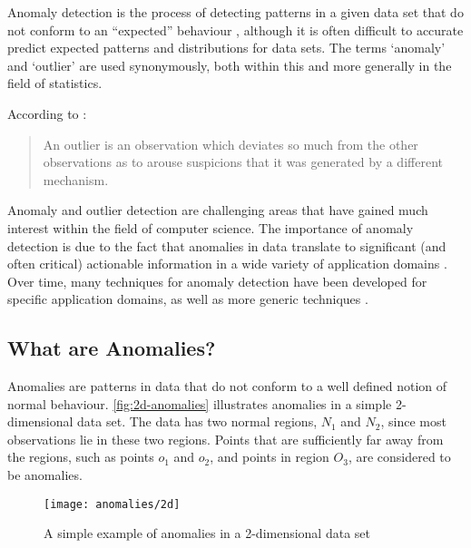 Anomaly detection is the process of detecting patterns in a given data set that
do not conform to an ``expected'' behaviour \cite{Chandola:2007}, although it is
often difficult to accurate predict expected patterns and distributions for data
sets. The terms `anomaly' and `outlier' are used synonymously, both within this
\thesis{} and more generally in the field of statistics.

According to \citeauthor{Hawkins:1980} \cite{Hawkins:1980}:
\begin{quote}
An outlier is an observation which deviates so much from the other observations
as to arouse suspicions that it was generated by a different mechanism.
\end{quote}

Anomaly and outlier detection are challenging areas that have gained much
interest within the field of computer science. The importance of anomaly
detection is due to the fact that anomalies in data translate to significant
(and often critical) actionable information in a wide variety of application
domains \cite{Chandola:2007}. Over time, many techniques for anomaly detection
have been developed for specific application domains, as well as more generic
techniques \cite{Chandola:2007}.

\subsection{What are Anomalies?}
\label{anomalyDetection:whatAre}
Anomalies are patterns in data that do not conform to a well defined notion of
normal behaviour. \autoref{fig:2d-anomalies} illustrates anomalies in a simple
2-dimensional data set. The data has two normal regions, $N_1$ and $N_2$, since
most observations lie in these two regions. Points that are sufficiently far
away from the regions, such as points $o_1$ and $o_2$, and points in region
$O_3$, are considered to be anomalies.

\begin{figure}
    \centering
    \texttt{[image: anomalies/2d]}
    \caption[A simple example of anomalies in a 2-dimensional data set]{A
        simple example of anomalies in a 2-dimensional data set
        \cite{Chandola:2007}}
    \label{fig:2d-anomalies}
\end{figure}

